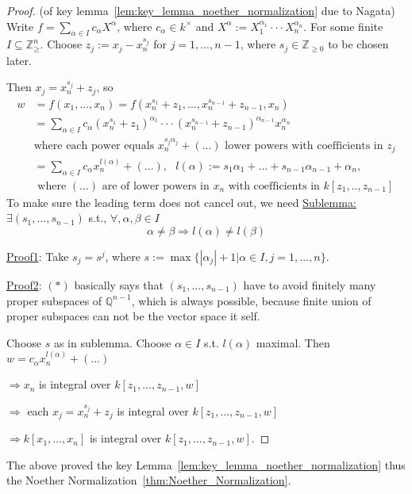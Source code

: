 \documentclass[11pt]{article}
\newcommand{\intg}{\mathbb Z}
\newcommand{\ratl}{\mathbb Q}
\newcommand{\Lrta}{\Longrightarrow}
\begin{document}
\begin{proof}(of key lemma~\ref{lem:key_lemma_noether_normalization} due to Nagata)
Write $f=\sum_{\alpha\in I}c_\alpha X^\alpha$, where $c_\alpha\in k^\times$ and $X^\alpha:=X_1^{\alpha_1}\cdot\cdot \cdot X^{\alpha_n}_n$. For some finite $I\subseteq \intg_{\geq }^n$. Choose $z_j:=x_j-x^{s_j}_n$ for $j=1,...,n-1$, where $s_j\in \intg_{\geq 0}$ to be chosen later.

Then $x_j=x^{s_j}_n+z_j$, so
$$
\begin{aligned}
w&=f(x_1,...,x_n)=f(x_n^{s_1}+z_1,...,x_n^{s_{n-1}}+z_{n-1},x_n)\\
&=\sum_{\alpha\in I}c_\alpha (x^{s_1}_n+z_1)^{\alpha_1}\cdot\cdot \cdot (x_n^{s_{n-1}}+z_{n-1})^{\alpha_{n-1}}x_n^{\alpha_n}\\
& \text{where each power equals } x_n^{s_j\alpha_j}+(...) \text{ lower powers with coefficients in $z_j$}\\
&=\sum_{\alpha\in I}c_\alpha x_n^{l(\alpha)}+(...),\ \ \ l(\alpha):=s_1\alpha_1+...+s_{n-1}\alpha_{n-1}+\alpha_n,\\ 
&\text{ where $(...)$ are of lower powers in $x_n$ with coefficients in $k[z_1,..,z_{n-1}]$}
\end{aligned}
$$
To make sure the leading term does not cancel out, we need
\underline{Sublemma:} $\exists (s_1,...,s_{n-1})$ s.t., $\forall, \alpha,\beta\in I$
\begin{equation}\tag*{(*)}
\alpha\neq \beta\Lrta l(\alpha)\neq l(\beta)
\end{equation}

\underline{Proof1}: Take $s_j=s^j$, where $s:=\max\{|\alpha_j|+1|\alpha\in I, j=1,...,n\}$.

\underline{Proof2}: $(*)$ basically says that $(s_1,...,s_{n-1})$ have to avoid finitely many proper subspaces of $\ratl^{n-1}$, which is always possible, because finite union of proper subspaces can not be the vector space it self.

Choose $s$ as in sublemma. Choose $\alpha\in I$ s.t. $l(\alpha)$ maximal. Then $w=c_\alpha x_n^{l(\alpha)}+(...)$

$\Lrta x_n$ is integral over $k[z_1,...,z_{n-1},w]$

$\Lrta$ each $x_{j}=x_n^{s_j}+z_j$ is integral over $k[z_1,...,z_{n-1},w]$

$\Lrta k[x_1,...,x_n]$ is integral over $k[z_1,...,z_{n-1},w]$.
\end{proof}

The above proved the key Lemma~\ref{lem:key_lemma_noether_normalization} thus the Noether Normalization~\ref{thm:Noether_Normalization}.
\end{document}
